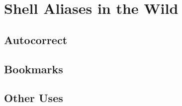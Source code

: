 \section{Shell Aliases in the Wild}






\subsection{Autocorrect}





\subsection{Bookmarks}

\subsection{Other Uses}




